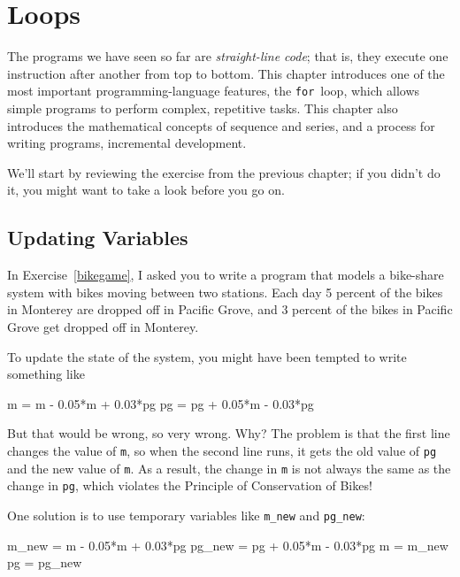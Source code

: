 
\chapter{Loops}
\label{loops}


The programs we have seen so far are \emph{straight-line code}; that is, they execute one instruction after another from top to bottom.
This chapter introduces one of the most important programming-language features, the \lstinline{for}~loop, which allows simple programs to perform complex, repetitive tasks. This chapter also introduces the mathematical concepts of sequence and series, and a process for writing programs, incremental development.

We'll start by reviewing the exercise from the previous chapter; if you didn't do it, you might want to take a look before you go on.

\section{Updating Variables}

In Exercise~\ref{bikegame}, I asked you to write a program that models a bike-share system with bikes moving between two stations.
Each day 5 percent of the bikes in Monterey are dropped off in Pacific Grove, and 3 percent of the bikes
in Pacific Grove get dropped off in Monterey.

To update the state of the system, you might have been tempted to write something
like


\begin{code}
m = m - 0.05*m + 0.03*pg
pg = pg + 0.05*m - 0.03*pg
\end{code}

But that would be wrong, so very wrong.  Why?  The problem is that
the first line changes the value of \lstinline{m}, so when the second line
runs, it gets the old value of \lstinline{pg} and the new value of \lstinline{m}.
As a result, the change in \lstinline{m} is not always the same as the
change in \lstinline{pg}, which violates the Principle of Conservation
of Bikes!

One solution is to use temporary variables like \lstinline{m_new} and \lstinline{pg_new}:

\begin{code}
m_new = m - 0.05*m + 0.03*pg
pg_new = pg + 0.05*m - 0.03*pg
m = m_new
pg = pg_new
\end{code}

